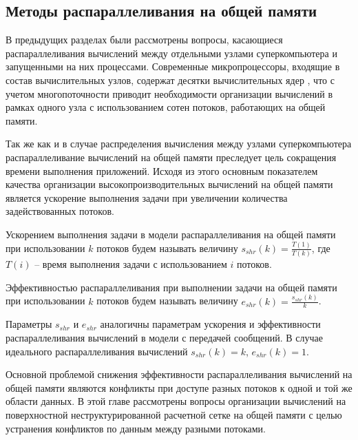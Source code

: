 
\subsection{Методы распараллеливания на общей памяти}

В предыдущих разделах были рассмотрены вопросы, касающиеся распараллеливания вычислений между отдельными узлами суперкомпьютера и запущенными на них процессами.
Современные микропроцессоры, входящие в состав вычислительных узлов, содержат десятки вычислительных ядер \cite{Section3IntroIntel,Section3IntroAMD,Kuzminsky2022ARM}, что с учетом многопоточности приводит необходимости организации вычислений в рамках одного узла с использованием сотен потоков, работающих на общей памяти.

Так же как и в случае распределения вычисления между узлами суперкомпьютера распараллеливание вычислений на общей памяти преследует цель сокращения времени выполнения приложений.
Исходя из этого основным показателем качества организации высокопроизводительных вычислений на общей памяти является ускорение выполнения задачи при увеличении количества задействованных потоков.

\begin{definition}
Ускорением выполнения задачи в модели распараллеливания на общей памяти при использовании $k$ потоков будем называть величину $s_{shr}(k) = \frac{T(1)}{T(k)}$, где $T(i)$ -- время выполнения задачи с использованием $i$ потоков.
\end{definition}

\begin{definition}
Эффективностью распараллеливания при выполнении задачи на общей памяти при использовании $k$ потоков будем называть величину $e_{shr}(k) = \frac{s_{shr}(k)}{k}$.
\end{definition}

Параметры $s_{shr}$ и $e_{shr}$ аналогичны параметрам ускорения и эффективности распараллеливания вычислений в модели с передачей сообщений.
В случае идеального распараллеливания вычислений $s_{shr}(k) = k$, $e_{shr}(k) = 1$.

Основной проблемой снижения эффективности распараллеливания вычислений на общей памяти являются конфликты при доступе разных потоков к одной и той же области данных.
В этой главе рассмотрены вопросы организации вычислений на поверхностной неструктурированной расчетной сетке на общей памяти с целью устранения конфликтов по данным между разными потоками.

